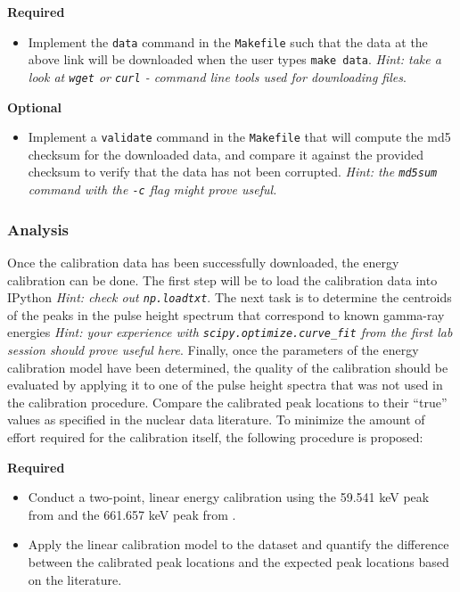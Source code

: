 \documentclass[11pt]{article}
\begin{document}
{\bf Required}
\begin{itemize}
  \item Implement the {\tt data} command in the {\tt Makefile} such that the
        data at the above link will be downloaded when the user types
        {\tt make data}. 
        \textit{Hint: take a look at {\tt wget} or {\tt curl} - command line tools 
                used for downloading files}.
\end{itemize}

{\bf Optional}
\begin{itemize}
  \item Implement a {\tt validate} command in the {\tt Makefile} that will
        compute the md5 checksum for the downloaded data, and compare it
        against the provided checksum to verify that the data has not
        been corrupted.
        \textit{Hint: the {\tt md5sum} command with the {\tt -c} flag might
                prove useful.}
\end{itemize}

\subsubsection*{Analysis}

Once the calibration data has been successfully downloaded, the energy 
calibration can be done.
The first step will be to load the calibration data into IPython 
\textit{Hint: check out {\tt np.loadtxt}}.
The next task is to determine the centroids of the peaks in the pulse height
spectrum that correspond to known gamma-ray energies
\textit{Hint: your experience with {\tt scipy.optimize.curve\_fit} from the first
        lab session should prove useful here}.
Finally, once the parameters of the energy calibration model have been 
determined, the quality of the calibration should be evaluated by applying it
to one of the pulse height spectra that was not used in the calibration 
procedure.
Compare the calibrated peak locations to their ``true'' values as specified in
the nuclear data literature.
To minimize the amount of effort required for the calibration itself, the
following procedure is proposed:

{\bf Required}
\begin{itemize}
  \item Conduct a two-point, linear energy calibration using the 59.541 keV
        peak from  and the 661.657 keV peak from .
  \item Apply the linear calibration model to the  dataset and 
        quantify the difference between the calibrated peak locations and the 
        expected peak locations based on the literature.
\end{itemize}
\end{document}

